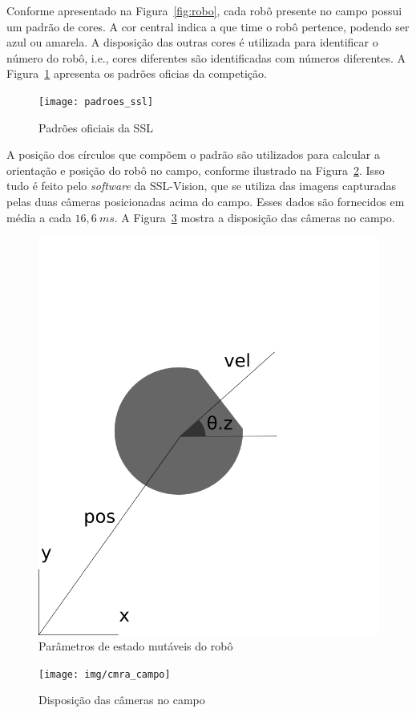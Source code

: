 Conforme apresentado na Figura~\ref{fig:robo}, cada robô presente no campo
possui um padrão de cores.  A cor central indica a que time o robô pertence,
podendo ser azul ou amarela.  A disposição das outras cores é utilizada para
identificar o número do robô, i.e., cores diferentes são identificadas com
números diferentes.  A Figura~\ref{fig:padroes_ssl} apresenta os padrões oficias
da competição.

\begin{figure}[thpb]
  \centering
  \texttt{[image: padroes\_ssl]}
  \caption{Padrões oficiais da SSL~\cite{zickler-ssl}}\label{fig:padroes_ssl}
\end{figure}

A posição dos círculos que compõem o padrão são utilizados para calcular a
orientação e posição do robô no campo, conforme ilustrado na
Figura~\ref{fig:rob_data}.  Isso tudo é feito pelo \textit{software} da
SSL-Vision, que se utiliza das imagens capturadas pelas duas câmeras posicionadas
acima do campo.  Esses dados são fornecidos em média a cada $16,6{\ }ms$.  A
Figura~\ref{fig:cmra_campo} mostra a disposição das câmeras no campo.

\begin{figure}[thpb]
  \centering
  \includegraphics[width=0.5\linewidth]{img/rob_data}
  \caption{Parâmetros de estado mutáveis do robô}\label{fig:rob_data}
\end{figure}

\begin{figure}[thpb]
  \centering
  \texttt{[image: img/cmra\_campo]}
  \caption{Disposição das câmeras no campo}\label{fig:cmra_campo}
\end{figure}

